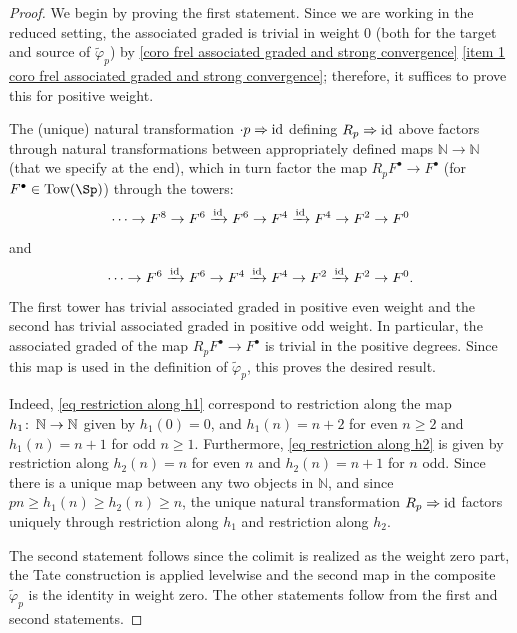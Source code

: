 \documentclass[english,10pt]{amsart}
\theoremstyle{definition}
\numberwithin{equation}{section}
\newcommand{\N}{\mathbb{N}}
\def\co{\colon\thinspace}
\begin{document}
\begin{proof}
We begin by proving the first statement. Since we are working in the reduced setting, the associated graded is trivial in weight $0$ (both for the target and source of $\widetilde{\varphi}_p$) by \autoref{coro frel associated graded and strong convergence} \eqref{item 1 coro frel associated graded and strong convergence}; therefore, it suffices to prove this for positive weight. 

The (unique) natural transformation  $\cdot p \Rightarrow \textup{id}$ defining $R_p \Rightarrow \textup{id}$ above factors through natural transformations between appropriately defined maps $\mathbb{N} \to \mathbb{N}$ (that we specify at the end),  which in turn factor the  map  $R_p F^\bullet \to F^\bullet$ (for $F^\bullet \in \mathrm{Tow}(\Sp)$) through the towers:
\begin{equation}\label{eq restriction along h1}
\cdots \to F^8 \to F^6 \xrightarrow{\textup{id}} F^6 \to F^4 \xrightarrow{\textup{id}} F^4 \to F^2\to F^0
\end{equation}
and 
\begin{equation}\label{eq restriction along h2}
\cdots \to F^6 \xrightarrow{\textup{id}} F^6 \to  F^4 \xrightarrow{\textup{id}} F^4 \to  F^2 \xrightarrow{\textup{id}} F^2\to F^0.
\end{equation}
The first tower has trivial associated graded in positive even weight and the second has trivial associated graded in positive odd weight. In particular, the associated graded of the map $R_p F^{\bullet} \to F^{\bullet}$ is trivial in the positive degrees. Since this map is used in the definition of $\tilde{\varphi}_p$, this proves the desired result. 

Indeed, \eqref{eq restriction along h1} correspond to restriction along the map $h_1\co \N \to \N$ given by $h_1(0) = 0$, and $h_1(n) = n+2$ for even $n\geq 2$ and $h_1(n) = n+1$ for odd $n \geq 1$. Furthermore, \eqref{eq restriction along h2} is given by restriction along $h_2(n) = n$ for even $n$ and $h_2(n) = n+1$ for $n$ odd. Since there is a unique map between any two objects in $\N$, and since $pn\geq h_1(n)\geq h_2(n)\geq n$, the unique natural transformation $R_p \Rightarrow \textup{id}$ factors uniquely through restriction along $h_1$ and restriction along $h_2$. 

The second statement follows since the colimit is realized as the weight zero part, the Tate construction is applied levelwise and the second map in the composite $\widetilde{\varphi}_p$ is the identity in weight zero. The other statements follow from the first and second statements. 
\end{proof}
\end{document}
